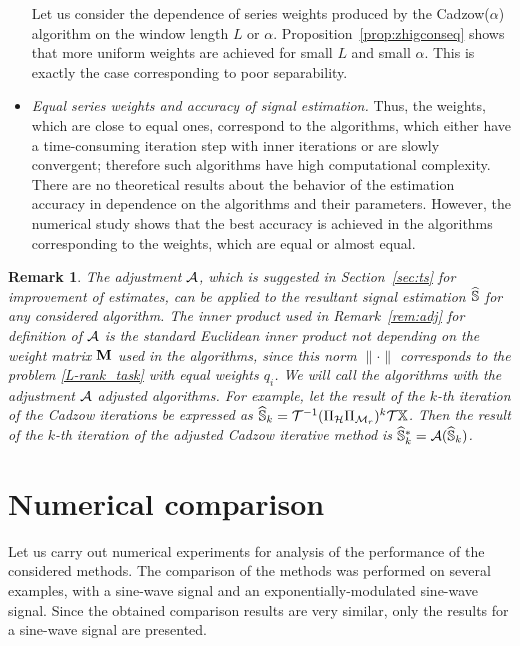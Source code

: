 \documentclass[sii]{ipart}
\newtheorem{remark}{Remark}
\begin{document}
\begin{itemize}
        Let us consider the dependence of series weights produced by the Cadzow($\alpha$) algorithm on the window length $L$ or $\alpha$. Proposition~\ref{prop:zhigconseq} shows that more uniform weights are achieved for small $L$ and small $\alpha$. This is exactly
        the case corresponding to poor separability.
 		\item \textit{Equal series weights and accuracy of signal estimation.}
 Thus, the weights, which are close to equal ones, correspond to the algorithms, which either have a time-consuming iteration step with inner iterations or are slowly convergent; therefore such algorithms have high computational complexity.
There are no theoretical results about the behavior of the estimation accuracy in dependence on the algorithms and their parameters. However, the numerical study shows that the best accuracy is achieved in the algorithms corresponding to the weights, which are equal or almost equal.	
\end{itemize}
	
	\begin{remark}
		\label{rem:adjust}
		The adjustment $\mathcal{A}$, which is suggested in Section~\ref{sec:ts} for improvement of estimates, can be applied to the resultant signal estimation $\widehat{\mathbb{S}}$ for any considered algorithm. The inner product used in Remark~\ref{rem:adj} for definition of $\mathcal{A}$ is the standard Euclidean inner product not depending on the weight matrix $\mathbf{M}$ used in the algorithms, since this norm $\|\cdot\|$ corresponds to the problem \eqref{L-rank_task} with equal weights $q_i$. We will call the algorithms with the adjustment $\mathcal{A}$ \emph{adjusted algorithms}. For example, let the result of the $k$-th iteration of the Cadzow iterations be expressed as $\widehat{\mathbb{S}}_k = \mathcal{T}^{-1}(\Pi_{\mathcal{H}} \Pi_{\mathcal{M}_r})^k \mathcal{T} \mathbb{X}$. Then the result of the $k$-th iteration of the adjusted Cadzow iterative method is $\widehat{\mathbb{S}}_k^*=\mathcal{A}(\widehat{\mathbb{S}}_k)$.
	\end{remark}

\section{Numerical comparison}
\label{sec:simul}
Let us carry out numerical experiments for analysis of the performance of the considered methods. The comparison of the methods was performed on several examples, with a sine-wave signal and an exponentially-modulated sine-wave signal.
Since the obtained comparison results are very similar, only the results for a sine-wave signal are presented.
\end{document}

